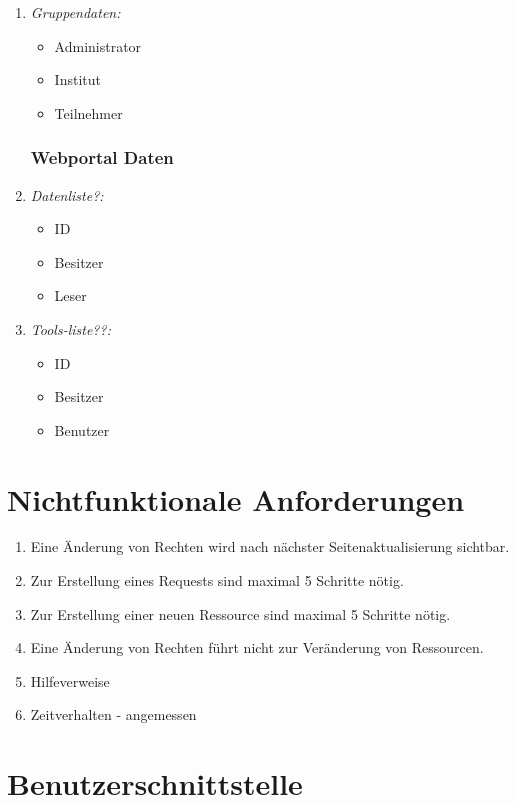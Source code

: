 \documentclass[parskip=full,11pt]{scrartcl}
\def\threedigits#1{%
  \ifnum#1<10 0\fi
  \ifnum#1<1 0\fi
  \number#1}
\begin{document}
\begin{enumerate}[label={\textbf{/D\protect\threedigits{\theenumi}0/}}, leftmargin=*]
\begin{itemize}
\end{itemize}

\item \textit{Gruppendaten:}
\begin{itemize}
\item Administrator
\item Institut
\item Teilnehmer
 \end{itemize}
 
\subsubsection{Webportal Daten}
\item \textit{Datenliste?:}
\begin{itemize}
\item ID
\item Besitzer
\item Leser
 \end{itemize}
 
 \item \textit{Tools-liste??:}
\begin{itemize}
\item ID
\item Besitzer
\item Benutzer
 \end{itemize}

\end{enumerate}
\section{Nichtfunktionale Anforderungen}
\begin{enumerate}[label={\textbf{/NF\protect\threedigits{\theenumi}0/}}, leftmargin=*]
\item Eine Änderung von Rechten wird nach nächster Seitenaktualisierung sichtbar.
\item Zur Erstellung eines Requests sind maximal 5 Schritte nötig.
\item Zur Erstellung einer neuen Ressource sind maximal 5 Schritte nötig.
\item Eine Änderung von Rechten führt nicht zur Veränderung von Ressourcen.
\item Hilfeverweise %
\item Zeitverhalten - angemessen %
\end{enumerate}



\section{Benutzerschnittstelle}
\end{document}

